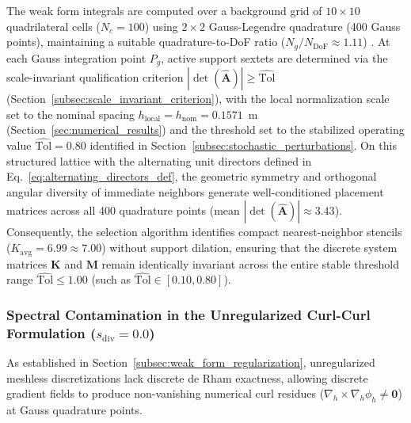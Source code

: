 \documentclass[preprint,12pt]{elsarticle}
\begin{document}
The weak form integrals are computed over a background grid of $10 \times 10$ quadrilateral cells ($N_c = 100$) using $2 \times 2$ Gauss-Legendre quadrature (400 Gauss points), maintaining a suitable quadrature-to-DoF ratio ($N_g / N_{\mathrm{DoF}} \approx 1.11$) \cite{belytschko1994element, liu2005introduction, liu2009mesh}. At each Gauss integration point $P_g$, active support sextets are determined via the scale-invariant qualification criterion $|\det(\widehat{\mathbf{A}})| \ge \widehat{\mathrm{Tol}}$ (Section~\ref{subsec:scale_invariant_criterion}), with the local normalization scale set to the nominal spacing $h_{\mathrm{local}} = h_{\mathrm{nom}} = 0.1571$~m (Section~\ref{sec:numerical_results}) and the threshold set to the stabilized operating value $\widehat{\mathrm{Tol}} = 0.80$ identified in Section~\ref{subsec:stochastic_perturbations}. On this structured lattice with the alternating unit directors defined in Eq.~\eqref{eq:alternating_directors_def}, the geometric symmetry and orthogonal angular diversity of immediate neighbors generate well-conditioned placement matrices across all 400 quadrature points (mean $|\det(\widehat{\mathbf{A}})| \approx 3.43$). Consequently, the selection algorithm identifies compact nearest-neighbor stencils ($K_{\mathrm{avg}} = 6.99 \approx 7.00$) without support dilation, ensuring that the discrete system matrices $\mathbf{K}$ and $\mathbf{M}$ remain identically invariant across the entire stable threshold range $\widehat{\mathrm{Tol}} \le 1.00$ (such as $\widehat{\mathrm{Tol}} \in [0.10, 0.80]$).

\subsubsection{Spectral Contamination in the Unregularized Curl-Curl Formulation (\texorpdfstring{$s_{\mathrm{div}} = 0.0$}{s(div) = 0.0})}
\label{subsubsec:unregularized_formulation}

As established in Section~\ref{subsec:weak_form_regularization}, unregularized meshless discretizations lack discrete de Rham exactness, allowing discrete gradient fields to produce non-vanishing numerical curl residues ($\nabla_h \times \nabla_h \phi_h \neq \mathbf{0}$) at Gauss quadrature points.
\end{document}
